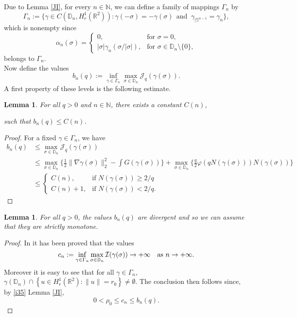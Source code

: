 \documentclass[11pt,leqno,twoside,reqno]{amsart}
\numberwithin{equation}{section}
\newtheorem{lemma}[theorem]{Lemma}
\begin{document}
Due to Lemma \ref{JI}, for every $n\in \mathbb N$, we can define a family of mappings $\Gamma_n$ by
\begin{equation*} 
\Gamma_{n}:=\{\gamma\in C(\mathbb D_{n}, H^{1}_{r}(\mathbb R^{2})): \gamma(-\sigma)=-\gamma(\sigma) \ \
\text{and } \ \gamma_{|\mathbb S^{n-1}}=\gamma_{n}\},
\end{equation*}
which is nonempty since
\[
\alpha_{n}(\sigma)=
\begin{cases}
0, & \mbox{for }\sigma=0,\\
|\sigma| \gamma_{n}(\sigma/|\sigma|), & \mbox{for } \sigma\in \mathbb D_{n}\setminus \{0\},
\end{cases}
\]
belongs to $\Gamma_{n}$. 
\\
Now define the values
\begin{equation*}
b_{n}(q):=\inf_{\gamma\in \Gamma_{n}}\max_{\sigma\in \mathbb D_{n}} \mathcal J_{q}(\gamma(\sigma)).
\end{equation*}
A first property of these levels is the following estimate.
\begin{lemma}\label{AnB}
For all $q>0$ and $n\in \mathbb N$, there exists a constant $C(n)$, 
 
such that $b_{n}(q){\leqslant} C(n)$.
\end{lemma}

\begin{proof}
For a fixed $\gamma\in \Gamma_{n}$, we have 
\begin{align*}
b_{n}(q)
&{\leqslant}
\max_{\sigma\in \mathbb D_{n}} \mathcal J_{q}(\gamma(\sigma)) \\
&{\leqslant}
\max_{\sigma\in \mathbb D_{n}}\Big\{\frac{1}{2}\|\nabla \gamma(\sigma)\|_{2}^{2}-\int G(\gamma(\sigma))\Big\}
+\max_{\sigma\in \mathbb D_{n}}\Big\{\frac{q}{2}\varphi(qN(\gamma(\sigma)))N(\gamma(\sigma))\Big\}\\
&{\leqslant}
\begin{cases}
C(n), & \textrm{if } N(\gamma(\sigma)){\geqslant} 2/q\\
C(n)+1,  & \textrm{if } N(\gamma(\sigma))< 2/q.
\end{cases}
\end{align*}
\end{proof}

\begin{lemma}\label{bninfty}
For all $q>0$, the values $b_{n}(q)$  are divergent 
and so we can assume that they are 
strictly monotone.
\end{lemma}
\begin{proof}
In \cite[Lemma 3.2]{HIT} it has been proved that  the values
$$c_{n}:=\inf_{\gamma\in \Gamma_{n}}\max_{\sigma\in \mathbb D_{n}} \mathcal I(\gamma(\sigma))\to+\infty\quad\hbox{as }n\to+\infty.$$
Moreover it is easy to see that 
for all $\gamma\in \Gamma_{n}$, $\gamma(\mathbb D_{n})\cap\left\{u\in H^{1}_{r}(\mathbb R^{2}): \|u\|=r_{0}\right\}\neq\emptyset$. 
The conclusion then follows since, by \eqref{i35} Lemma \ref{JI}, 
\begin{equation*} 
0<\rho_{0}{\leqslant} c_{n}{\leqslant} b_{n}(q).
\end{equation*}
\end{proof}
\end{document}
